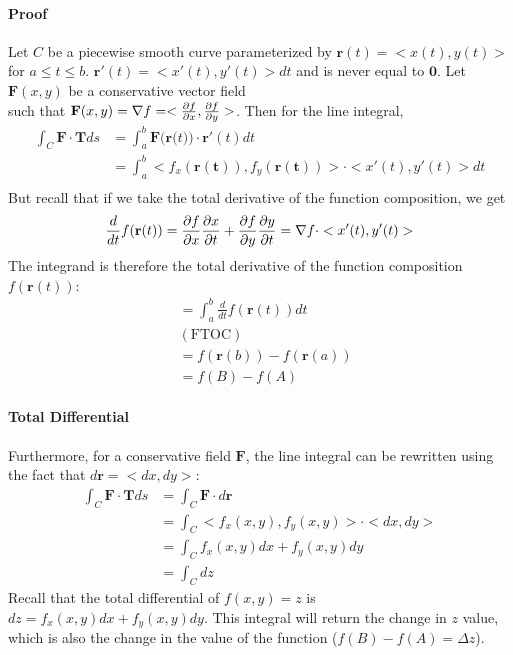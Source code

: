 \documentclass{article}
\begin{document}
\paragraph{Proof} Let $C$ be a piecewise smooth curve parameterized by $\mathbf{r}(t)=<x(t), y(t)>$ for $a\leq t \leq b$. $\mathbf{r}'(t) = <x'(t), y'(t)> dt$ and is never equal to $\mathbf{0}$. Let $\mathbf{F}(x,y)$ be a conservative vector field \\
such that $\mathbf{F}(x,y) = \nabla f = <\frac{\partial f}{\partial x}, \frac{\partial f}{\partial y}>$. Then for the line integral,
\begin{align*}
    \int_C \mathbf{F \cdot T}ds &= \int_a^b \mathbf{F(r(}t)) \cdot \mathbf{r'}(t)dt \\
    &= \int_a^b <f_x(\mathbf{r(t)}), f_y(\mathbf{r(t)})> \cdot <x'(t), y'(t)> dt \\
\end{align*}
But recall that if we take the total derivative of the function composition, we get
\[ \frac{d}{dt}f(\mathbf{r}(t)) = \frac{\partial f}{\partial x}\frac{\partial x}{\partial t} + \frac{\partial f}{\partial y} \frac{\partial y}{\partial t} = \nabla f \cdot <x'(t), y'(t)> \]
The integrand is therefore the total derivative of the function composition $f(\mathbf{r}(t))$:
\begin{align*}
    &= \int_a^b \frac{d}{dt} f(\mathbf{r}(t)) dt \\
    &\mathrm{(FTOC)}\\
    &= f(\mathbf{r}(b)) - f(\mathbf{r}(a)) \\
    &= f(B) - f(A)
\end{align*}

\paragraph{Total Differential} Furthermore, for a conservative field $\mathbf{F}$, the line integral can be rewritten using the fact that $d\mathbf{r} = <dx, dy>$:
\begin{align*}
    \int_C \mathbf{F \cdot T}ds &= \int_C \mathbf{F} \cdot d\mathbf{r} \\
    &= \int_C <f_x(x,y), f_y(x,y)> \cdot <dx,dy> \\
    &= \int_C f_x(x,y)dx + f_y(x,y)dy \\
    &= \int_C dz 
\end{align*}
Recall that the total differential of $f(x,y)=z$ is $dz = f_x(x,y) dx + f_y(x,y) dy$. This integral will return the change in $z$ value, which is also the change in the value of the function ($f(B) - f(A) = \Delta z$).
\end{document}
